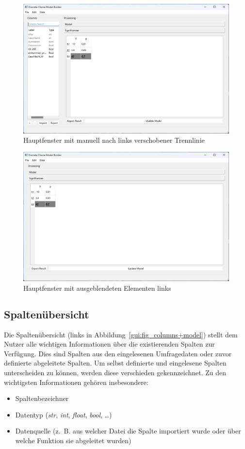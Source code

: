 \documentclass{article}
\begin{document}
\begin{figure}[H]%
  \centering
  \includegraphics[width=12cm]{specifications/img/gui-screenshots/splitter1.png}
  \caption{Hauptfenster mit manuell nach links verschobener Trennlinie}
  \label{gui:fig_splitter1}
\end{figure}

\begin{figure}[H]%
  \centering
  \includegraphics[width=12cm]{specifications/img/gui-screenshots/splitter2.png}
  \caption{Hauptfenster mit ausgeblendeten Elementen links}
  \label{gui:fig_splitter2}
\end{figure}

\subsection{Spaltenübersicht}
Die Spaltenübersicht (links in Abbildung~\ref{gui:fig_columns+model}) stellt dem Nutzer alle wichtigen Informationen über die existierenden Spalten zur Verfügung. Dies sind Spalten aus den eingelesenen Umfragedaten oder zuvor definierte abgeleitete Spalten. Um selbst definierte und eingelesene Spalten unterscheiden zu können, werden diese verschieden gekennzeichnet. Zu den wichtigsten Informationen gehören insbesondere:
\begin{itemize}
    \item Spaltenbezeichner
    \item Datentyp (\emph{str}, \emph{int}, \emph{float}, \emph{bool}, \dots)
    \item Datenquelle (z.~B. aus welcher Datei die Spalte importiert wurde oder über welche Funktion sie abgeleitet wurden)
\end{itemize}
\end{document}

